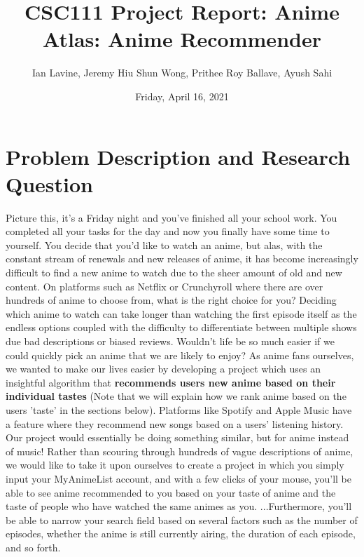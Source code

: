 \documentclass[fontsize=11pt]{article}
\title{CSC111 Project Report: Anime Atlas: Anime Recommender}
\author{Ian Lavine, Jeremy Hiu Shun Wong, Prithee Roy Ballave, Ayush Sahi}
\date{Friday, April 16, 2021}
\begin{document}
\maketitle

\section*{Problem Description and Research Question}

Picture this, it’s a Friday night and you’ve finished all your school work. You completed all your tasks for the day and now you finally have some time to yourself. You decide that you’d like to watch an anime, but alas, with the constant stream of renewals and new releases of anime, it has become increasingly difficult to find a new anime to watch due to the sheer amount of old and new content. On platforms such as Netflix or Crunchyroll where there are over hundreds of anime to choose from, what is the right choice for you? Deciding which anime to watch can take longer than watching the first episode itself as the endless options coupled with the difficulty to differentiate between multiple shows due bad descriptions or biased reviews. Wouldn't life be so much easier if we could quickly pick an anime that we are likely to enjoy? As anime fans ourselves, we wanted to make our lives easier by developing a project which uses an insightful algorithm that \textbf{recommends users new anime based on their individual tastes} (Note that we will explain how we rank anime based on the users 'taste' in the sections below). Platforms like Spotify and Apple Music have a feature where they recommend new songs based on a users’ listening history. Our project would essentially be doing something similar, but for anime instead of music! Rather than scouring through hundreds of vague descriptions of anime, we would like to take it upon ourselves to create a project in which you simply input your MyAnimeList account, and with a few clicks of your mouse, you’ll be able to see anime recommended to you based on your taste of anime and the taste of people who have watched the same animes as you. ...Furthermore, you’ll be able to narrow your search field based on several factors such as the number of episodes, whether the anime is still currently airing, the duration of each episode, and so forth. 
\end{document}

